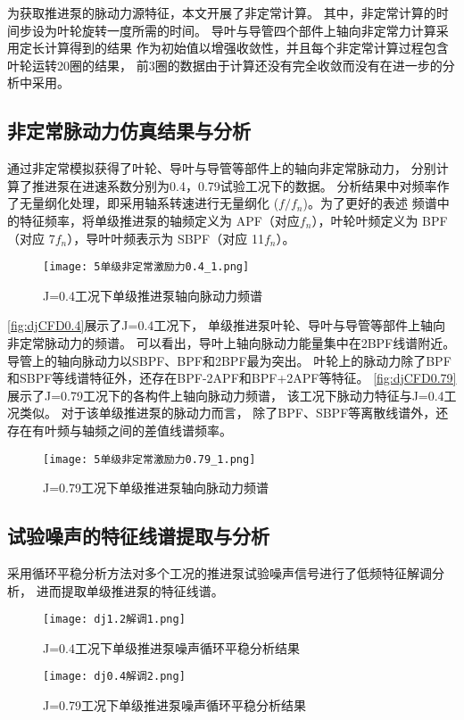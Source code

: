 为获取推进泵的脉动力源特征，本文开展了非定常计算。
其中，非定常计算的时间步设为叶轮旋转一度所需的时间。
导叶与导管四个部件上轴向非定常力计算采用定长计算得到的结果
作为初始值以增强收敛性，并且每个非定常计算过程包含叶轮运转20圈的结果，
前3圈的数据由于计算还没有完全收敛而没有在进一步的分析中采用。
\subsection{非定常脉动力仿真结果与分析}
通过非定常模拟获得了叶轮、导叶与导管等部件上的轴向非定常脉动力，
分别计算了推进泵在进速系数分别为0.4，0.79试验工况下的数据。
分析结果中对频率作了无量纲化处理，即采用轴系转速进行无量纲化 ($f/f_n$)。为了更好的表述
频谱中的特征频率，将单级推进泵的轴频定义为 APF（对应$f_n$），叶轮叶频定义为 BPF
（对应 7$f_n$），导叶叶频表示为 SBPF（对应 11$f_n$）。
\begin{figure}[htbp]
    \centering
    \texttt{[image: 5单级非定常激励力0.4\_1.png]}
    \caption{\label{fig:djCFD0.4}J=0.4工况下单级推进泵轴向脉动力频谱}
\end{figure}

\autoref{fig:djCFD0.4}展示了J=0.4工况下，
单级推进泵叶轮、导叶与导管等部件上轴向非定常脉动力的频谱。
可以看出，导叶上轴向脉动力能量集中在2BPF线谱附近。
导管上的轴向脉动力以SBPF、BPF和2BPF最为突出。
叶轮上的脉动力除了BPF和SBPF等线谱特征外，还存在BPF-2APF和BPF+2APF等特征。
\autoref{fig:djCFD0.79}展示了J=0.79工况下的各构件上轴向脉动力频谱，
该工况下脉动力特征与J=0.4工况类似。
对于该单级推进泵的脉动力而言，
除了BPF、SBPF等离散线谱外，还存在有叶频与轴频之间的差值线谱频率。
\begin{figure}[htbp]
    \centering
    \texttt{[image: 5单级非定常激励力0.79\_1.png]}
    \caption{\label{fig:djCFD0.79}J=0.79工况下单级推进泵轴向脉动力频谱}
\end{figure}
\subsection{试验噪声的特征线谱提取与分析}
采用循环平稳分析方法对多个工况的推进泵试验噪声信号进行了低频特征解调分析，
进而提取单级推进泵的特征线谱。
\begin{figure}[htbp]
    \centering
    \texttt{[image: dj1.2解调1.png]}
    \caption{\label{fig:djjietiao1.2}J=0.4工况下单级推进泵噪声循环平稳分析结果}
\end{figure}

\begin{figure}[htbp]
    \centering
    \texttt{[image: dj0.4解调2.png]}
    \caption{\label{fig:djjietiao0.4}J=0.79工况下单级推进泵噪声循环平稳分析结果}
\end{figure}

